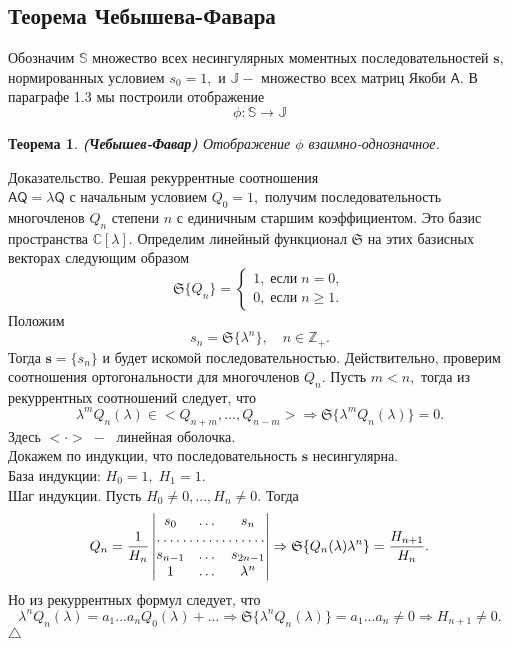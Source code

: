 \documentclass[12pt,a4paper]{article}
\theoremstyle{plain}   \newtheorem{Pro}{Задача}
\newtheorem{The}{Теорема}
\begin{document}
\subsection{ Теорема Чебышева-Фавара }
$ \; $
\\

Обозначим
$ \mathbb{S} $
множество всех несингулярных моментных последовательностей
$ \mathbf{s}, $
нормированных условием
$ s_0 =1 , $
и
$ \mathbb{J} - $
множество всех матриц Якоби
$ \mathsf{A} . $
В параграфе 1.3 мы построили отображение
$$
  \phi : \mathbb{S} \longrightarrow \mathbb{J}
$$
\begin{The}
{\bfseries (Чебышев-Фавар)}
Отображение
$ \phi $
взаимно-однозначное.
\end{The}
{\Large Доказательство.}
Решая рекуррентные соотношения\\
$ \mathsf{A} \mathsf{Q} = \lambda \mathsf{Q} $
с начальным условием
$ Q_0 =1 , $
получим последовательность многочленов
$ Q_n $
степени
$ n $
с единичным старшим коэффициентом.
Это базис пространства
$ \mathbb{C} [ \lambda ] . $
Определим линейный функционал
$ \mathfrak{S} $
на этих базисных векторах следующим образом
\begin{equation*}
  \mathfrak{S} \{ Q_n \} =
    \begin{cases}
	  1, \; если \; n=0, \\
	  0, \; если \; n \geq 1.
	\end{cases}
\end{equation*}
Положим
$$
  s_n = \mathfrak{S} \{ \lambda ^n \} ,
  \quad n \in \mathbb{Z}_+ .
$$
Тогда
$ \mathbf{s} = \{ s_n \} $
и будет искомой последовательностью.
Действительно, проверим соотношения ортогональности для
многочленов
$ Q_n . $
Пусть
$ m<n , $
тогда из рекуррентных соотношений следует, что
$$
  \lambda ^m Q_n (\lambda ) \in
  <Q_{n+m},...,Q_{n-m}> \Rightarrow
  \mathfrak{S} \{ \lambda ^m Q_n (\lambda ) \} =0.
$$
Здесь
$ < \cdot > \; - \; $
линейная оболочка.\\
Докажем по индукции, что последовательность
$ \mathbf{s} $
несингулярна.\\
База индукции:
$ H_0 =1, \; H_1 =1. $
\\
Шаг индукции. Пусть
$ H_0 \not = 0,..., H_n \not = 0. $
Тогда
\begin{equation*}
  Q_n =\frac{1}{H_n }
    \begin{vmatrix}
	  s_0 & \dots & s_n \\
	  \hdotsfor{3}\\
	  s_{n-1} & \dots & s_{2n-1}\\
	  1 & \dots & \lambda ^n
	\end{vmatrix}
  \Rightarrow
  \mathfrak{S} \{ Q_n (\lambda ) \lambda ^n \} =
  \frac{H_{n+1}}{H_n }.
\end{equation*}
Но из рекуррентных формул следует, что
$$
  \lambda ^n Q_n (\lambda ) =
  a_1 ...a_n Q_0 (\lambda ) +...
  \Rightarrow
  \mathfrak{S} \{ \lambda ^n Q_n (\lambda ) \} =
  a_1 ... a_n \not = 0
  \Rightarrow H_{n+1} \not =0.
$$
$ \triangle $
\newpage
\end{document}
